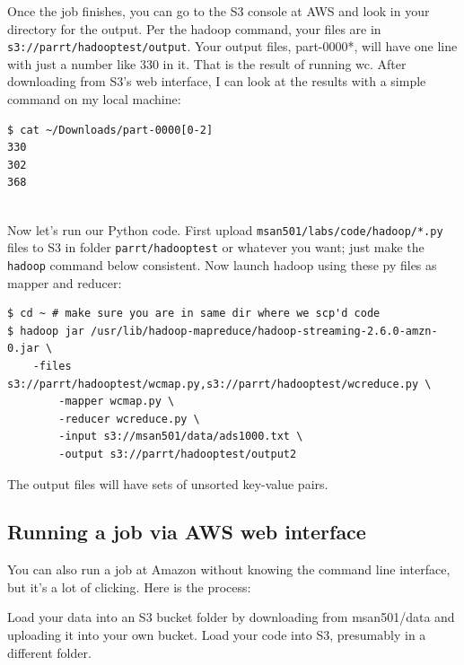 \begin{fullwidth}
Once the job finishes, you can go to the S3 console at AWS and look in your directory for the output. Per the hadoop command, your files are in {\tt s3://parrt/hadooptest/output}. Your output files, part-0000*, will have one line with just a number like 330 in it. That is the result of running wc. After downloading from S3's web interface, I can look at the results with a simple command on my local machine:

\begin{lstlisting}[style=BashInputStyle]
$ cat ~/Downloads/part-0000[0-2]
330	
302	
368
\end{lstlisting}

\begin{center}
\end{center}
~\\

Now let's run our Python code. First upload {\tt msan501/labs/code/hadoop/*.py} files to S3 in folder {\tt parrt/hadooptest} or whatever you want; just make the {\tt hadoop} command below consistent. Now launch hadoop using these py files as mapper and reducer:

\begin{lstlisting}[style=BashInputStyle]
$ cd ~ # make sure you are in same dir where we scp'd code
$ hadoop jar /usr/lib/hadoop-mapreduce/hadoop-streaming-2.6.0-amzn-0.jar \
	-files s3://parrt/hadooptest/wcmap.py,s3://parrt/hadooptest/wcreduce.py \
    	-mapper wcmap.py \
    	-reducer wcreduce.py \
    	-input s3://msan501/data/ads1000.txt \
    	-output s3://parrt/hadooptest/output2
\end{lstlisting}

The output files will have sets of unsorted key-value pairs.

\subsection{Running a job via AWS web interface}

You can also run a job at Amazon without knowing the command line interface, but it's a lot of clicking. Here is the process:

\step Load your data into an S3 bucket folder by downloading from msan501/data and uploading it into your own bucket. Load your code into S3, presumably in a different folder.


\end{fullwidth}
